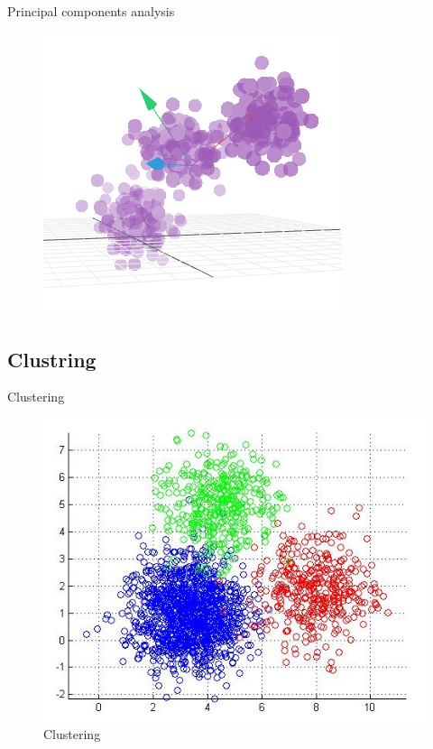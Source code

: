 \documentclass[ignorenonframetext,]{beamer}
\begin{document}
\begin{frame}{Principal components analysis}

\begin{figure}
\centering
\includegraphics{pics/09-2.png}
\caption{}
\end{figure}

\end{frame}

\subsection{Clustring}\label{clustring}

\begin{frame}{Clustering}

\begin{figure}
\centering
\includegraphics{pics/03.png}
\caption{Clustering}
\end{figure}

\end{frame}
\end{document}
